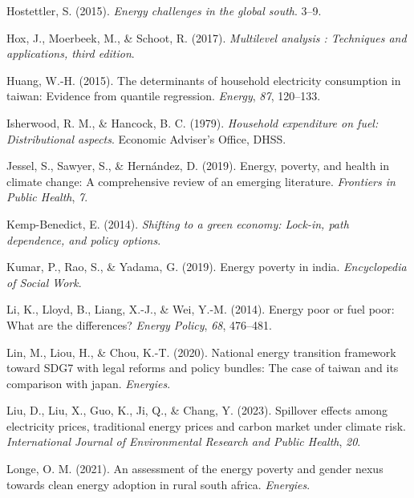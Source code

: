 \documentclass[
  twoside,
  openright,
  degree    = master,               %
  language  = english,              %
  fontset   = overleaf,             %
  watermark = true,                 %
  doi       = true,                 %
]{ntuthesis}
\newlength{\cslhangindent}
\newlength{\cslentryspacingunit} %
\newenvironment{CSLReferences}[2] %
 {%
  \setlength{\parindent}{0pt}
  \ifodd #1
  \let\oldpar\par
  \def\par{\hangindent=\cslhangindent\oldpar}
  \fi
  \setlength{\parskip}{#2\cslentryspacingunit}
 }%
 {}
\begin{document}
\begin{CSLReferences}{1}{0}
\leavevmode{}%
Hostettler, S. (2015). \emph{Energy challenges in the global south}.
3--9.

\leavevmode{}%
Hox, J., Moerbeek, M., \& Schoot, R. (2017). \emph{Multilevel analysis :
Techniques and applications, third edition}.

\leavevmode{}%
Huang, W.-H. (2015). The determinants of household electricity
consumption in taiwan: Evidence from quantile regression. \emph{Energy},
\emph{87}, 120--133.

\leavevmode{}%
Isherwood, R. M., \& Hancock, B. C. (1979). \emph{Household expenditure
on fuel: Distributional aspects}. Economic Adviser's Office, DHSS.

\leavevmode{}%
Jessel, S., Sawyer, S., \& Hernández, D. (2019). Energy, poverty, and
health in climate change: A comprehensive review of an emerging
literature. \emph{Frontiers in Public Health}, \emph{7}.

\leavevmode{}%
Kemp-Benedict, E. (2014). \emph{Shifting to a green economy: Lock-in,
path dependence, and policy options}.

\leavevmode{}%
Kumar, P., Rao, S., \& Yadama, G. (2019). Energy poverty in india.
\emph{Encyclopedia of Social Work}.

\leavevmode{}%
Li, K., Lloyd, B., Liang, X.-J., \& Wei, Y.-M. (2014). Energy poor or
fuel poor: What are the differences? \emph{Energy Policy}, \emph{68},
476--481.

\leavevmode{}%
Lin, M., Liou, H., \& Chou, K.-T. (2020). National energy transition
framework toward SDG7 with legal reforms and policy bundles: The case of
taiwan and its comparison with japan. \emph{Energies}.

\leavevmode{}%
Liu, D., Liu, X., Guo, K., Ji, Q., \& Chang, Y. (2023). Spillover
effects among electricity prices, traditional energy prices and carbon
market under climate risk. \emph{International Journal of Environmental
Research and Public Health}, \emph{20}.

\leavevmode{}%
Longe, O. M. (2021). An assessment of the energy poverty and gender
nexus towards clean energy adoption in rural south africa.
\emph{Energies}.


\end{CSLReferences}
\end{document}
